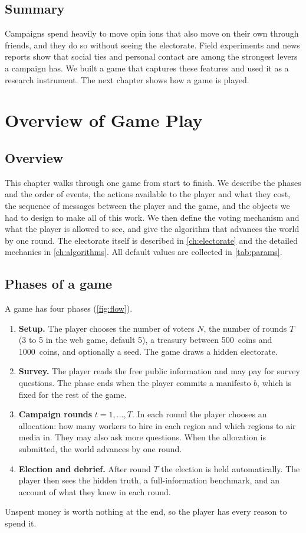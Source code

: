 \documentclass[11pt,a4paper,oneside]{report}
\newcommand{\coins}[1]{#1~coins}
\newcommand{\overviewsection}{\section{Overview}}
\newcommand{\summarysection}{\section{Summary}}
\begin{document}
\summarysection

Campaigns spend heavily to move opin
ions that also move on their own through friends, and they do so
without seeing the electorate. Field experiments and news reports show that social ties and personal
contact are among the strongest levers a campaign has. We built a game that captures these features and
used it as a research instrument. The next chapter shows how a game is played.

\chapter{Overview of Game Play}\label{ch:gameplay}

\overviewsection

This chapter walks through one game from start to finish. We describe the phases and the order of events,
the actions available to the player and what they cost, the sequence of messages between the player and
the game, and the objects we had to design to make all of this work. We then define the voting mechanism
and what the player is allowed to see, and give the algorithm that advances the world by one round. The
electorate itself is described in \cref{ch:electorate} and the detailed mechanics in
\cref{ch:algorithms}. All default values are collected in
\cref{tab:params}.

\section{Phases of a game}

A game has four phases (\cref{fig:flow}).
\begin{enumerate}
  \item \textbf{Setup.} The player chooses the number of voters $N$, the number of rounds $T$ (3 to 5 in
        the web game, default 5), a treasury between \coins{500} and \coins{1000}, and optionally a seed.
        The game draws a hidden electorate.
  \item \textbf{Survey.} The player reads the free public information and may pay for survey questions.
        The phase ends when the player commits a manifesto $b$, which is fixed for the rest of the game.
  \item \textbf{Campaign rounds} $t = 1,\dots,T$. In each round the player chooses an allocation: how
        many workers to hire in each region and which regions to air media in. They may also ask more
        questions. When the allocation is submitted, the world advances by one round.
  \item \textbf{Election and debrief.} After round $T$ the election is held automatically. The player
        then sees the hidden truth, a full-information benchmark, and an account of what they knew in
        each round.
\end{enumerate}
Unspent money is worth nothing at the end, so the player has every reason to spend it.
\end{document}
